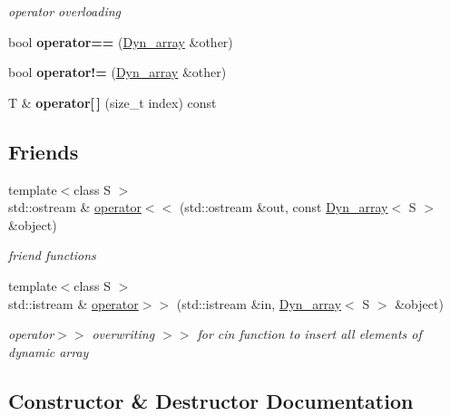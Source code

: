 \begin{DoxyCompactItemize}
\begin{DoxyCompactList}\small\item\em operator overloading \end{DoxyCompactList}\item 
\mbox{\label{classDyn__array_a28a167f80e6fc521b554d4593fb34fed}} 
bool {\bfseries operator==} (\hyperlink{classDyn__array}{Dyn\+\_\+array} \&other)
\item 
\mbox{\label{classDyn__array_aa8b85bba86c621693fab80fd9f8d18bc}} 
bool {\bfseries operator!=} (\hyperlink{classDyn__array}{Dyn\+\_\+array} \&other)
\item 
\mbox{\label{classDyn__array_ad0a2b07ac0796bec497173998c25a279}} 
T \& {\bfseries operator\mbox{[}$\,$\mbox{]}} (size\+\_\+t index) const
\end{DoxyCompactItemize}
\subsection*{Friends}
\begin{DoxyCompactItemize}
\item 
{\footnotesize template$<$class S $>$ }\\std\+::ostream \& \hyperlink{classDyn__array_aebc2873551e997f690220158398e5bf3}{operator$<$$<$} (std\+::ostream \&out, const \hyperlink{classDyn__array}{Dyn\+\_\+array}$<$ S $>$ \&object)
\begin{DoxyCompactList}\small\item\em friend functions \end{DoxyCompactList}\item 
{\footnotesize template$<$class S $>$ }\\std\+::istream \& \hyperlink{classDyn__array_a3b9156ade0a68fef20fc21e06aed9cc0}{operator$>$$>$} (std\+::istream \&in, \hyperlink{classDyn__array}{Dyn\+\_\+array}$<$ S $>$ \&object)
\begin{DoxyCompactList}\small\item\em operator$>$$>$ overwriting $>$$>$ for cin function to insert all elements of dynamic array \end{DoxyCompactList}\end{DoxyCompactItemize}


\subsection{Constructor \& Destructor Documentation}
\mbox{\label{classDyn__array_a3afc99260021fc0a0861c7a6dffa7dcb}} 
